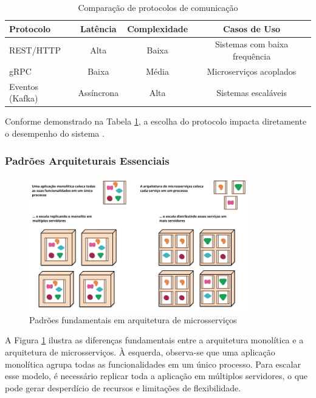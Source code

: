\begin{table}[h]
\centering
\caption{Comparação de protocolos de comunicação}
\begin{tabular}{|l|c|c|c|}
\hline
\textbf{Protocolo} & \textbf{Latência} & \textbf{Complexidade} & \textbf{Casos de Uso} \\
\hline
REST/HTTP & Alta & Baixa & Sistemas com baixa frequência \\
gRPC & Baixa & Média & Microserviços acoplados \\
Eventos (Kafka) & Assíncrona & Alta & Sistemas escaláveis \\
\hline
\end{tabular}
\label{tab:protocolos}
\end{table}

Conforme demonstrado na Tabela \ref{tab:protocolos}, a escolha do protocolo impacta diretamente o desempenho do sistema \cite{niswar2023performance}.

\subsubsection{Padrões Arquiteturais Essenciais}
\begin{figure}[h]
\centering
\includegraphics[width=0.85\textwidth]{images/microservice.png}
\caption{Padrões fundamentais em arquitetura de microsserviços}
\label{fig:micro_patterns}
\end{figure}

A Figura \ref{fig:micro_patterns} ilustra as diferenças fundamentais entre a arquitetura monolítica e a arquitetura de microsserviços. À esquerda, observa-se que uma aplicação monolítica agrupa todas as funcionalidades em um único processo. Para escalar esse modelo, é necessário replicar toda a aplicação em múltiplos servidores, o que pode gerar desperdício de recursos e limitações de flexibilidade.

